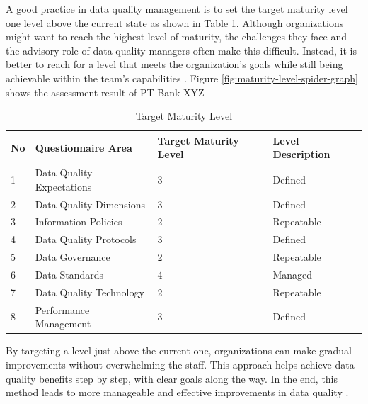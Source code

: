 \documentclass[conference]{IEEEtran}
\begin{document}
A good practice in data quality management is to set the target maturity level one level above the current state as shown in Table \ref{tab:target-maturity-level}. Although organizations might want to reach the highest level of maturity, the challenges they face and the advisory role of data quality managers often make this difficult. Instead, it is better to reach for a level that meets the organization's goals while still being achievable within the team’s capabilities \cite{loshin_dqi}. Figure \ref{fig:maturity-level-spider-graph} shows the assessment result of PT Bank XYZ

\begin{table}[H]
\caption{Target Maturity Level}
\label{tab:target-maturity-level}
\centering
\begin{tabular}{|p{0.3cm}|p{3cm}|p{1cm}|p{2cm}|}
\hline
\textbf{No} & \textbf{Questionnaire Area} & \textbf{Target Maturity Level}&\textbf{Level Description} \\
\hline
1 & Data Quality Expectations & 3 & Defined\\
\hline
2 & Data Quality Dimensions & 3 & Defined\\
\hline
3 & Information Policies & 2 & Repeatable\\
\hline
4 & Data Quality Protocols & 3 & Defined \\
\hline
5 & Data Governance & 2 & Repeatable \\
\hline
6 & Data Standards & 4 & Managed \\
\hline
7 & Data Quality Technology & 2 & Repeatable\\
\hline
8 & Performance Management & 3 & Defined\\
\hline
\end{tabular}
\end{table}

By targeting a level just above the current one, organizations can make gradual improvements without overwhelming the staff. This approach helps achieve data quality benefits step by step, with clear goals along the way. In the end, this method leads to more manageable and effective improvements in data quality \cite{loshin_dqi}.

\end{document}
